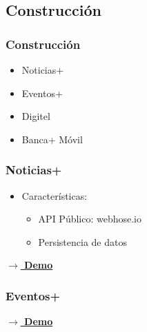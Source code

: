 \documentclass{beamer}
\begin{document}
\subsection{Construcción}

\begin{frame}[fragile]
\frametitle{Construcción}
\begin{itemize}
	\item Noticias+
	\item Eventos+
	\item Digitel
	\item Banca+ Móvil
\end{itemize}

\end{frame}


\begin{frame}[fragile]
\frametitle{Noticias+}
\begin{itemize}
	\item Características:
	\begin{itemize}
		\item API Público: webhose.io
		\item Persistencia de datos
	\end{itemize}
\end{itemize}
     
\textbf{\href{videos/demo-noticias.mp4}{$\rightarrow$ Demo}} 

\end{frame}






\begin{frame}[fragile]
\frametitle{Eventos+}


\textbf{ \href{videos/demo-eventos.mp4}{$\rightarrow$ Demo}}


\end{frame}
\end{document}
